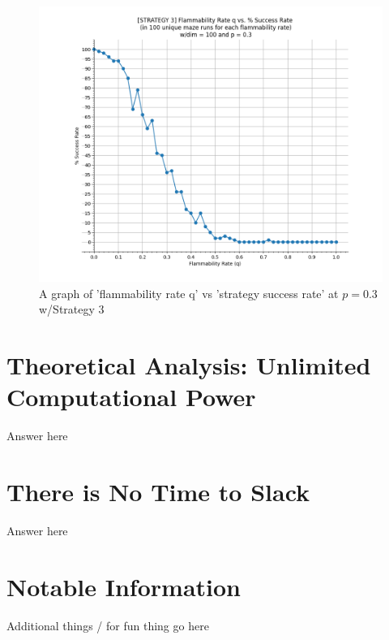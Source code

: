 \documentclass[11pt]{article}
\begin{document}
\begin{figure}[!]
\centering
\includegraphics[scale=0.50]{Strategy3_q_successRate.PNG}
\caption{A graph of 'flammability rate q' vs 'strategy success rate' at $p = 0.3$ w/Strategy 3}
\end{figure}

\pagebreak
\section{Theoretical Analysis: Unlimited Computational Power}
Answer here
	\pagebreak
\section{There is No Time to Slack}
Answer here
	\pagebreak
\section{Notable Information}
Additional things / for fun thing go here
\end{document}
